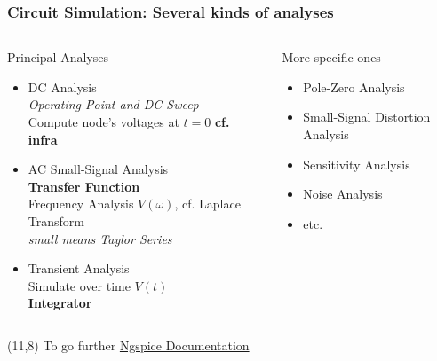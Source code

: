 \begin{frame}
  \frametitle{Circuit Simulation: Several kinds of analyses}
  \begin{columns}
    \begin{column}[t]{.6\textwidth}
      Principal Analyses \\[1em]
      \begin{itemize}
      \item DC Analysis \\
        \textit{Operating Point and DC Sweep} \\
        Compute node's voltages at $t=0$
        \textbf{cf. infra} \\[1em]
      \item AC Small-Signal Analysis \\
        \textbf{Transfer Function} \\
        Frequency Analysis $V(\omega)$, cf. Laplace Transform \\
        \textit{small means Taylor Series} \\[1em]
      \item Transient Analysis \\
        Simulate over time $V(t)$ \\
        \textbf{Integrator}
      \end{itemize}
    \end{column}
    \begin{column}[t]{.4\textwidth}
      More specific ones \\[1em]
      \begin{itemize}
      \item Pole-Zero Analysis
      \item Small-Signal Distortion Analysis
      \item Sensitivity Analysis
      \item Noise Analysis
      \item etc.\@
      \end{itemize}
    \end{column}
  \end{columns}
  \begin{textblock}{6}(11,8)
    {\tiny
      To go further \href{http://ngspice.sourceforge.net/docs.html}{Ngspice Documentation}
    }
  \end{textblock}
\end{frame}

